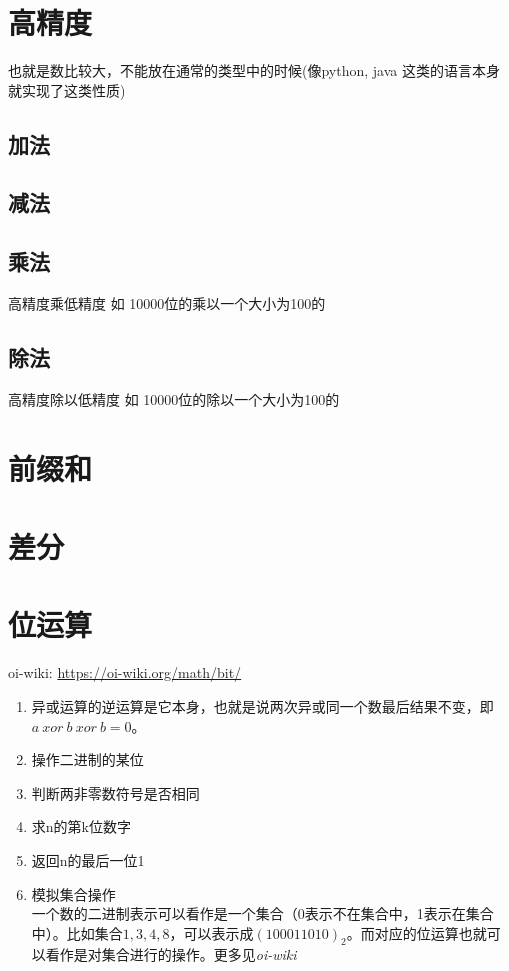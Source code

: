 \section{高精度}
也就是数比较大，不能放在通常的类型中的时候(像python, java 这类的语言本身就实现了这类性质)
\subsection{加法}

\subsection{减法}

\subsection{乘法}
高精度乘低精度 如 10000位的乘以一个大小为100的

\subsection{除法}
高精度除以低精度 如 10000位的除以一个大小为100的


\section{前缀和}


\section{差分}


\section{位运算}
oi-wiki: \href{https://oi-wiki.org/math/bit/}{https://oi-wiki.org/math/bit/}
\begin{enumerate}
    \item 异或运算的逆运算是它本身，也就是说两次异或同一个数最后结果不变，即 $a \ xor \  b \ xor \  b = 0$。
    \item 操作二进制的某位
    
    \item 判断两非零数符号是否相同
    
    \item 求n的第k位数字
    
    \item 返回n的最后一位1
    
    \item 模拟集合操作 \\
    一个数的二进制表示可以看作是一个集合（0表示不在集合中，1表示在集合中）。比如集合${1,3,4,8}$，可以表示成$(100011010)_{2}$。而对应的位运算也就可以看作是对集合进行的操作。更多见\textit{oi-wiki}
\end{enumerate}

